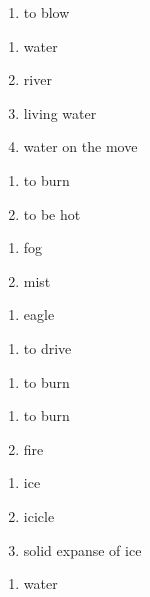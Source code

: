 \begin{enumerate}
\item to blow
\end{enumerate}
\begin{enumerate}
\item water
\item river
\item living water
\item water on the move
\end{enumerate}
\begin{enumerate}
\item to burn
\item to be hot
\end{enumerate}
\begin{enumerate}
\item fog
\item mist
\end{enumerate}
\begin{enumerate}
\item eagle
\end{enumerate}
\begin{enumerate}
\item to drive
\end{enumerate}
\begin{enumerate}
\item to burn
\end{enumerate}
\begin{enumerate}
\item to burn
\item fire
\end{enumerate}
\begin{enumerate}
\item ice
\item icicle
\item solid expanse of ice
\end{enumerate}
\begin{enumerate}
\item water
\end{enumerate}

